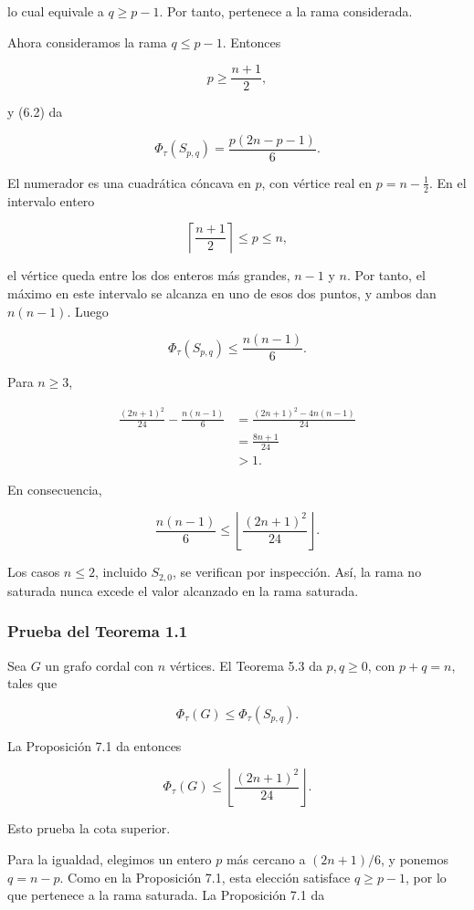 \documentclass[
  11pt,
]{article}
\begin{document}
lo cual equivale a \(q\ge p-1\). Por tanto, pertenece a la rama
considerada.

Ahora consideramos la rama \(q\le p-1\). Entonces

\[
p\ge\frac{n+1}{2},
\]

y (6.2) da

\[
\Phi_\tau(S_{p,q})
=
\frac{p(2n-p-1)}6.
\]

El numerador es una cuadrática cóncava en \(p\), con vértice real en
\(p=n-\tfrac12\). En el intervalo entero

\[
\left\lceil\frac{n+1}{2}\right\rceil
\le p\le n,
\]

el vértice queda entre los dos enteros más grandes, \(n-1\) y \(n\). Por
tanto, el máximo en este intervalo se alcanza en uno de esos dos puntos,
y ambos dan \(n(n-1)\). Luego

\[
\Phi_\tau(S_{p,q})
\le
\frac{n(n-1)}6.
\]

Para \(n\ge3\),

\[
\begin{aligned}
\frac{(2n+1)^2}{24}
-
\frac{n(n-1)}6
&=
\frac{(2n+1)^2-4n(n-1)}{24}\\
&=
\frac{8n+1}{24}\\
&>1.
\end{aligned}
\]

En consecuencia,

\[
\frac{n(n-1)}6
\le
\left\lfloor\frac{(2n+1)^2}{24}\right\rfloor.
\]

Los casos \(n\le2\), incluido \(S_{2,0}\), se verifican por inspección.
Así, la rama no saturada nunca excede el valor alcanzado en la rama
saturada.

\subsubsection{Prueba del Teorema 1.1}\label{prueba-del-teorema-1.1}

Sea \(G\) un grafo cordal con \(n\) vértices. El Teorema 5.3 da
\(p,q\ge0\), con \(p+q=n\), tales que

\[
\Phi_\tau(G)\le\Phi_\tau(S_{p,q}).
\]

La Proposición 7.1 da entonces

\[
\Phi_\tau(G)
\le
\left\lfloor\frac{(2n+1)^2}{24}\right\rfloor.
\]

Esto prueba la cota superior.

Para la igualdad, elegimos un entero \(p\) más cercano a \((2n+1)/6\), y
ponemos \(q=n-p\). Como en la Proposición 7.1, esta elección satisface
\(q\ge p-1\), por lo que pertenece a la rama saturada. La Proposición
7.1 da
\end{document}
